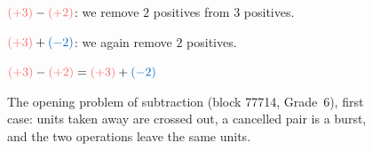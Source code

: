 \documentclass[11pt,a4paper]{article}
\theoremstyle{definition}
\newcommand\tribuNegative[2]{%
\begin{scope}[shift={(#1,#2)}]
\begin{scope}[scale=0.75]
\draw[fill=colorprop, thick] (0,0)circle(0.4);
\draw[ thick] (-0.15,0)--(0.15,0);
\end{scope}
\end{scope}
}
\newcommand\tribuPositive[2]{%

\begin{scope}[shift={(#1,#2)}]
\begin{scope}[scale=0.75]
\draw[fill=colordef, thick] (0,0)circle(0.4);
\draw[ thick] (0,-0.15)--(0,0.15);
\draw[ thick] (-0.15,0)--(0.15,0);
\end{scope}
\end{scope}
}
\newcommand\explosionForce[2]{
\begin{scope}[shift={(#1,#2)}]
  \shade[inner color=colorprop, outer color=colordef] (0,0) circle (0.3);
 \end{scope}
}
\newcommand\additionRelativeNumber[2]{
\pgfmathsetmacro{\numberFirst}{#1}
\pgfmathsetmacro{\numberFirstAbs}{int(abs(\numberFirst)}

\pgfmathsetmacro{\numberSecond}{#2}
\pgfmathsetmacro{\numberSecondAbs}{int(abs(\numberSecond)}


\pgfmathparse{ifthenelse(\numberFirst*\numberSecond>0,1,0)} 
\ifthenelse{\pgfmathresult=1}
{

\foreach \x in {1,...,\numberFirstAbs}  {
\pgfmathparse{ifthenelse(\numberFirst>0,1,0)} \ifthenelse{\pgfmathresult=1}{ 
\tribuPositive{\x*0.75}{0};
}
{
\tribuNegative{\x*0.75}{0};
}
}
\node at (\numberFirstAbs*0.75+0.65,0){$+$};

\foreach \x in {1,...,\numberSecondAbs}  {
\pgfmathsetmacro{\translateX}{(\x+\numberFirstAbs)*0.75+0.5}
\pgfmathparse{ifthenelse(\numberFirst>0,1,0)} \ifthenelse{\pgfmathresult=1}{ 
\tribuPositive{\translateX}{0};
}
{
\tribuNegative{\translateX}{0};
}
}

\node at ( {\numberFirstAbs*0.75+\numberSecondAbs*0.75+1.1},0){$=$};

\pgfmathparse{int(\numberFirstAbs+\numberSecondAbs)}
\foreach \x in {1,...,\pgfmathresult}  {
\pgfmathsetmacro{\translateX}{(\numberFirstAbs+\numberSecondAbs+\x)*0.75+0.95}
\pgfmathparse{ifthenelse(\numberFirst>0,1,0)} \ifthenelse{\pgfmathresult=1}{ 
\tribuPositive{\translateX}{0};
}
{
\tribuNegative{\translateX}{0};
}

}

}
{


\pgfmathparse{int(\numberFirst!=0)}
\ifthenelse{\pgfmathresult = 1}{
\foreach \x in {1,...,\numberFirstAbs}  {

\pgfmathsetmacro{\translateX}{(\x)*0.75}
\pgfmathparse{ifthenelse(\numberFirst>0,1,0)} 
\ifthenelse{\pgfmathresult=1}{
  \tribuPositive{\translateX}{0};
}{
  \tribuNegative{\translateX}{0};
}
}
}{}

\node at (\numberFirstAbs*0.75+0.65,0){$+$};

\pgfmathparse{int(\numberSecond!=0)}
\ifthenelse{\pgfmathresult = 1}{
\foreach \x in {1,...,\numberSecondAbs}  {

\pgfmathsetmacro{\translateX}{(\x+\numberFirstAbs)*0.75+0.5}
\pgfmathparse{ifthenelse(\numberSecond>0,1,0)} 
\ifthenelse{\pgfmathresult=1}{
  \tribuPositive{\translateX}{0};
}{
  \tribuNegative{\translateX}{0};
}
}}{}

\node at ( {\numberFirstAbs*0.75+\numberSecondAbs*0.75+1.1},0){$=$};


\pgfmathparse{ifthenelse(abs(abs(\numberFirst)-abs(\numberSecond))>0,1,0)} 
\ifthenelse{\pgfmathresult=1}{


\node at ( {\numberFirstAbs*0.75+\numberSecondAbs*0.75+1.1},-1){$=$};
\pgfmathsetmacro{\translateX}{(\numberFirstAbs+\numberSecondAbs)*0.75+0.95}




\pgfmathparse{ifthenelse(\numberFirst+\numberSecond>0,1,0)} 
\ifthenelse{\pgfmathresult=1}{
\pgfmathparse{abs(abs(\numberFirst)-abs(\numberSecond))} 
\foreach \x in {1,...,\pgfmathresult}  {
\tribuPositive{\translateX+\x*0.75}{0};
\tribuPositive{\translateX+\x*0.75}{-1};
}
\pgfmathparse{max(abs(\numberFirst),abs(\numberSecond))-abs(abs(\numberFirst)-abs(\numberSecond))} 
\foreach \x in {1,...,\pgfmathresult}  {
\pgfmathsetmacro{\translateX}{(\numberFirstAbs+\numberSecondAbs+abs(abs(\numberFirst)-abs(\numberSecond)))*0.75+0.95}
\explosionForce{\translateX+\x*0.75}{0};
}
}
{
\pgfmathparse{abs(abs(\numberFirst)-abs(\numberSecond))} 
\foreach \x in {1,...,\pgfmathresult}  {
\tribuNegative{\translateX+\x*0.75}{0};
\tribuNegative{\translateX+\x*0.75}{-1};
}
\pgfmathparse{max(abs(\numberFirst),abs(\numberSecond))-abs(abs(\numberFirst)-abs(\numberSecond))} 
\foreach \x in {1,...,\pgfmathresult}  {

\pgfmathsetmacro{\translateX}{(\numberFirstAbs+\numberSecondAbs+abs(abs(\numberFirst)-abs(\numberSecond)))*0.75+0.95}
\explosionForce{\translateX+\x*0.75}{0};
}
}
}
{
\pgfmathsetmacro{\translateX}{(\numberFirstAbs+\numberSecondAbs)*0.75+0.95}
\pgfmathparse{abs(\numberFirst)} 
\foreach \x in {1,...,\pgfmathresult}  {
\explosionForce{\translateX+\x*0.75}{0};
}
}
}
}
\newcommand\equivalentSubtractionAddition[2]{
\pgfmathsetmacro{\numberFirst}{#1}
\pgfmathsetmacro{\numberSecond}{#2}

\pgfmathsetmacro{\numberFirstAbs}{abs(\numberFirst)}
\pgfmathsetmacro{\numberSecondAbs}{abs(\numberSecond)}

\foreach \x in {1,...,\numberFirstAbs}  {
\pgfmathparse{ifthenelse(\numberFirst>0,1,0)} 
\ifthenelse{\pgfmathresult=1}{
\tribuPositive{\x*0.75}{0};
}{
\tribuNegative{\x*0.75}{0};
}
}
\node at (\numberFirstAbs*0.75+0.65,0){$-$};

\foreach \x in {1,...,\numberSecondAbs}  {
\pgfmathparse{ifthenelse(\numberSecond>0,1,0)} 
\ifthenelse{\pgfmathresult=1}{
\tribuPositive{\numberFirstAbs*0.75+\x*0.75+0.5}{0};
}{
\tribuNegative{\numberFirstAbs*0.75+\x*0.75+0.5}{0};
}
}
\node at (\numberFirstAbs*0.75+\numberSecondAbs*0.75+1.1,0){$=$};

\begin{scope}[shift={(\numberFirstAbs*0.75+\numberSecondAbs*0.75+1.1,0)}]
\foreach \x in {1,...,\numberFirstAbs}  {
\pgfmathparse{ifthenelse(\numberFirst>0,1,0)} 
\ifthenelse{\pgfmathresult=1}{
\tribuPositive{\x*0.75}{0};
}{
\tribuNegative{\x*0.75}{0};
}
}
\node at (\numberFirstAbs*0.75+0.65,0){$+$};

\foreach \x in {1,...,\numberSecondAbs}  {
\pgfmathparse{ifthenelse(\numberSecond>0,1,0)} 
\ifthenelse{\pgfmathresult=1}{
\tribuNegative{\numberFirstAbs*0.75+\x*0.75+0.5}{0};
}{
\tribuPositive{\numberFirstAbs*0.75+\x*0.75+0.5}{0};

}
}
\end{scope}
}
\begin{document}
\begin{figure}[htbp]
\centering
\begin{minipage}{0.48\textwidth}\centering
\small $\textcolor{colordef}{(+3)}-\textcolor{colordef}{(+2)}$: we remove $2$ positives from $3$ positives.\\[4pt]
\end{minipage}\hfill
\begin{minipage}{0.48\textwidth}\centering
\small $\textcolor{colordef}{(+3)}+\textcolor{colorprop}{(-2)}$: we again remove $2$ positives.\\[4pt]
\end{minipage}

\bigskip
\small $\textcolor{colordef}{(+3)}-\textcolor{colordef}{(+2)}=\textcolor{colordef}{(+3)}+\textcolor{colorprop}{(-2)}$\\[4pt]
\caption{The opening problem of subtraction (block 77714, Grade~6), first case: units taken away are crossed out, a cancelled pair is a burst, and the two operations leave the same units.}
\label{fig:takeaway}
\end{figure}
\end{document}

